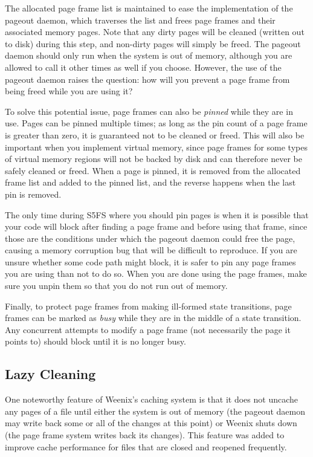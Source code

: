 The allocated page frame list is maintained to ease the implementation of the pageout daemon, which traverses the list and frees page frames and their associated memory pages. Note that any dirty pages will be cleaned (written out to disk) during this step, and non-dirty pages will simply be freed. The pageout daemon should only run when the system is out of memory, although you are allowed to call it other times as well if you choose. However, the use of the pageout daemon raises the question: how will you prevent a page frame from being freed while you are using it?

To solve this potential issue, page frames can also be \emph{pinned} while they are in use. Pages can be pinned multiple times; as long as the pin count of a page frame is greater than zero, it is guaranteed not to be cleaned or freed. This will also be important when you implement virtual memory, since page frames for some types of virtual memory regions will not be backed by disk and can therefore never be safely cleaned or freed. When a page is pinned, it is removed from the allocated frame list and added to the pinned list, and the reverse happens when the last pin is removed.

The only time during S5FS where you should pin pages is when it is possible that your code will block after finding a page frame and before using that frame, since those are the conditions under which the pageout daemon could free the page, causing a memory corruption bug that will be difficult to reproduce. If you are unsure whether some code path might block, it is safer to pin any page frames you are using than not to do so. When you are done using the page frames, make sure you unpin them so that you do not run out of memory.

Finally, to protect page frames from making ill-formed state transitions, page frames can be marked as \emph{busy} while they are in the middle of a state transition. Any concurrent attempts to modify a page frame (not necessarily the page it points to) should block until it is no longer busy.

\subsection{Lazy Cleaning}

One noteworthy feature of Weenix's caching system is that it does not uncache any pages of a file until either the system is out of memory (the pageout daemon may write back some or all of the changes at this point) or Weenix shuts down (the page frame system writes back its changes). This feature was added to improve cache performance for files that are closed and reopened frequently.

